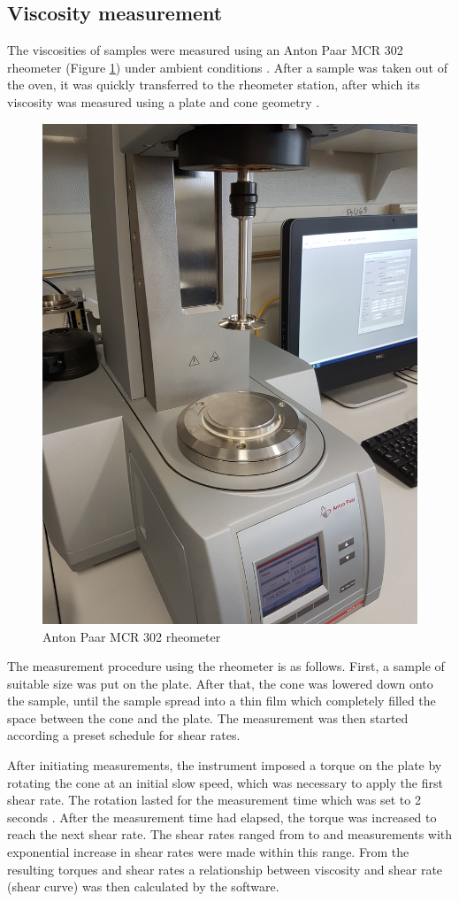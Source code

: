\subsection{Viscosity measurement}
The viscosities of samples were measured using an Anton Paar MCR 302 rheometer (Figure \ref{fig:antonPaar}) under ambient conditions \why. After a sample was taken out of the oven, it was quickly transferred to the rheometer station, after which its viscosity was measured using a plate and cone geometry \why.

\begin{figure}[h]
    \centering
    \includegraphics[width=.5\textwidth, angle=270]{img/fig/antonpaar.jpg}
    \caption{Anton Paar MCR 302 rheometer}
    \label{fig:antonPaar}
\end{figure}

The measurement procedure using the rheometer is as follows. First, a sample of suitable size was put on the plate. After that, the cone was lowered down onto the sample, until the sample spread into a thin film which completely filled the space between the cone and the plate. The measurement was then started according a preset schedule for shear rates. 

After initiating measurements, the instrument imposed a torque on the plate by rotating the cone at an initial slow speed, which was necessary to apply the first shear rate. The rotation lasted for the measurement time which was set to 2 seconds \why. After the measurement time had elapsed, the torque was increased to reach the next shear rate. The shear rates ranged from \what to \what and \what measurements with exponential increase in shear rates were made within this range. From the resulting torques and shear rates a relationship between viscosity and shear rate (shear curve) was then calculated by the software.

